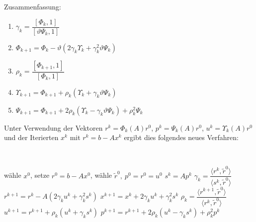 Zusammenfassung:
\begin{enumerate}
\item $\gamma_k = \dfrac{\left[\Phi_k,1\right]}{\left[ \vartheta \Psi_k,1 \right]}$
\item $\Phi_{k+1} = \Phi_k - \vartheta \left( 2 \gamma_k \Upsilon_k + \gamma_k^2 \vartheta \Psi_k \right)$
\item $\rho_k = \dfrac{\left[\Phi_{k+1},1 \right]}{\left[ \Phi_k,1 \right] }$
\item $\Upsilon_{k+1} = \Phi_{k+1} + \rho_k \left( \Upsilon_k + \gamma_k \vartheta \Psi_k \right) $
\item $\Psi_{k+1} = \Phi_{k+1} + 2 \rho_k \left( \Upsilon_k - \gamma_k \vartheta \Psi_k \right) + \rho^2_k \Psi_k$
\end{enumerate}

Unter Verwendung der Vektoren $r^k = \Phi_k(A)r^0$, $p^k = \Psi_k(A)r^0$,
$u^k = \Upsilon_k(A)r^0$ und der Iterierten $x^k$ mit $r^k = b-Ax^k$ ergibt
dies folgendes neues Verfahren:
\begin{alg}
~               %
\vspace*{-2\baselineskip}       %
\begin{algorithm}
  \begin{algorithmic} 
    \STATE w\"ahle $x^0$, setze $r^0 = b-Ax^0$, w\"ahle $\tilde{r}^0,\ p^0=r^0=u^0$
	\STATE $s^k=Ap^k$
      \STATE $\gamma_k = \dfrac{\langle r^k, \tilde{r}^0 \rangle}{\langle s^k, \tilde{r}^0 \rangle}$
	\STATE $r^{k+1} = r^k - A\left(2 \gamma_k u^k + \gamma_k^2 s^k \right)$
	\STATE $x^{k+1} = x^k + 2 \gamma_k u^k + \gamma_k^2 s^k$
	\STATE $\rho_k= \dfrac{\langle r^{k+1},\tilde{r}^0 \rangle}{\langle r^k, \tilde{r}^0 \rangle}$
	\STATE $u^{k+1} = r^{k+1} + \rho_k \left( u^k + \gamma_k s^k \right)$
	\STATE $p^{k+1}=r^{k+1} + 2 \rho_k \left( u^k - \gamma_k s^k \right) + \rho^2_k p^k$
    \ENDFOR
  \end{algorithmic}
\end{algorithm}
\end{alg}

